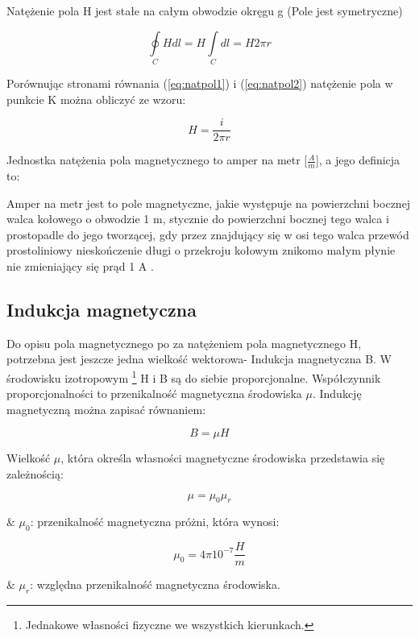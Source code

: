 Natężenie pola H jest stałe na całym obwodzie okręgu g (Pole jest symetryczne)

\begin{equation} \label{eq:natpol2}
	\oint\limits_C H dl = H \int\limits_C dl = H 2 \pi r
\end{equation}

Porównując stronami równania (\ref{eq:natpol1}) i (\ref{eq:natpol2}) natężenie pola w punkcie K można obliczyć ze wzoru:

\begin{equation} \label{eq:natpol3}
	H = \frac{i}{2 \pi r}
\end{equation}

Jednostka natężenia pola magnetycznego to amper na metr [$ \frac{A}{m} $], a jego definicja to:
	   
\begin{defn}
	Amper na metr jest to pole magnetyczne, jakie występuje na powierzchni bocznej walca kołowego o obwodzie 1 m, stycznie do powierzchni bocznej tego walca i prostopadle do jego tworzącej, gdy przez znajdujący się w osi tego walca przewód prostoliniowy nieskończenie długi o przekroju kołowym znikomo małym płynie nie zmieniający się prąd 1 A \cite{kaluszko}.
\end{defn}

\subsection{Indukcja magnetyczna}

Do opisu pola magnetycznego po za natężeniem pola magnetycznego H, potrzebna jest jeszcze jedna wielkość wektorowa- Indukcja magnetyczna B. W środowisku izotropowym \footnote{Jednakowe własności fizyczne we wszystkich kierunkach.} H i B są do siebie proporcjonalne. Współczynnik proporcjonalności to przenikalność magnetyczna środowiska $ \mu $. Indukcję magnetyczną można zapisać równaniem:

\begin{equation} \label{eq:indmag1}
	B = \mu H
\end{equation}

Wielkość $ \mu $, która określa własności magnetyczne środowiska przedstawia się zależnością:

\begin{equation} \label{eq:indmag2}
	\mu = \mu_0 \mu_r
\end{equation}

\begin{easylist}
	& $ \mu_0 $: przenikalność magnetyczna próżni, która wynosi:
	
	\begin{equation} \label{eq:indmag3}
		\mu_0 = 4 \pi 10^{-7} \frac{H}{m}
	\end{equation}
	
	& $ \mu_r $: względna przenikalność magnetyczna środowiska.
	\\
\end{easylist} 

